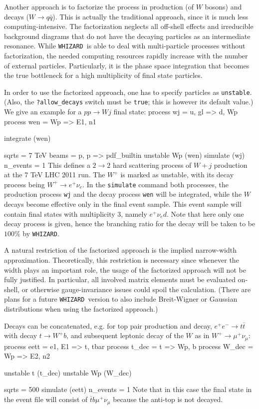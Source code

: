 \documentclass[12pt]{book}
\newenvironment{code}%
  {\begingroup\footnotesize
   \quote
   \Verbatim}%
  {\endVerbatim
   \endquote
   \endgroup\noindent}
\newcommand{\ttt}[1]{\texttt{#1}}
\newcommand{\whizard}{\ttt{WHIZARD}}
\begin{document}
Another approach is to factorize the process in production (of $W$ bosons) and
decays ($W\to q\bar q$).  This is actually the traditional approach, since it
is much less computing-intensive.  The factorization neglects all off-shell
effects and irreducible background diagrams that do not have the decaying
particles as an intermediate resonance.  While \whizard\ is able to deal with
multi-particle processes without factorization, the needed computing resources
rapidly increase with the number of external particles. Particularly,
it is the phase space integration that becomes the true bottleneck for
a high multiplicity of final state particles.

In order to use the factorized approach, one has to specify particles
as \ttt{unstable}.  (Also, the \ttt{?allow\_decays} switch must be \ttt{true};
this is however its default value.)  We give an example for a $pp \to Wj$ final
state:
\begin{code}
process wj  = u, gl => d, Wp
process wen = Wp => E1, n1

integrate (wen)

sqrts = 7 TeV
beams = p, p => pdf_builtin
unstable Wp (wen)
simulate (wj) { n_events = 1 }
\end{code}
This defines a $2 \to 2$ hard scattering process of $W + j$ production
at the 7 TeV LHC 2011 run. The $W^+$ is marked as unstable, with its
decay process being $W^+ \to e^+ \nu_e$. In the \ttt{simulate} command
both processes, the production process \ttt{wj} and the decay process
\ttt{wen} will be integrated, while the $W$ decays become effective
only in the final event sample. This event sample will contain final
states with multiplicity $3$, namely $e^+ \nu_e d$. Note that here
only one decay process is given, hence the branching ratio for the
decay will be taken to be $100 \%$ by \whizard.

A natural restriction of the factorized approach is the implied narrow-width
approximation.  Theoretically, this restriction is necessary since whenever
the width plays an important role, the usage of the factorized approach will
not be fully justified.  In particular, all involved matrix elements must be
evaluated on-shell, or otherwise gauge-invariance issues could spoil the
calculation.  (There are plans for a future \whizard\ version
to also include Breit-Wigner or Gaussian distributions when using the
factorized approach.)

Decays can be concatenated, e.g. for top pair production and
decay, $e^+ e^- \to t \bar t$ with decay $t \to W^+ b$, and subsequent
leptonic decay of the $W$ as in $W^+ \to \mu^+ \nu_\mu$:
\begin{code}
process eett = e1, E1 => t, tbar
process t_dec = t => Wp, b
process W_dec = Wp => E2, n2

unstable t (t_dec)
unstable Wp (W_dec)

sqrts = 500
simulate (eett) { n_events = 1 }
\end{code}
Note that in this case the final state in the event file will consist
of $\bar t b \mu^+ \nu_\mu$ because the anti-top is not decayed.
\end{document}
